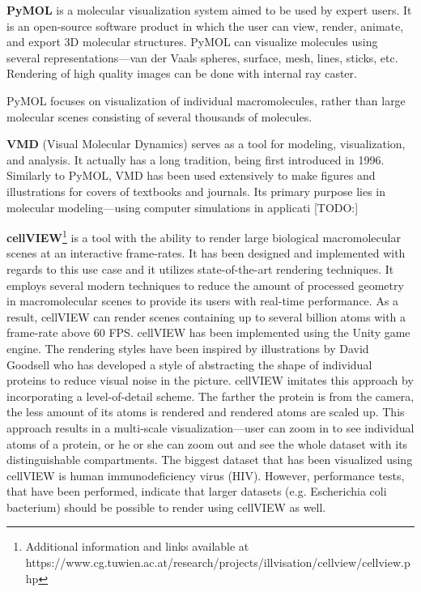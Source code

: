 \documentclass[
  digital, %
  table,   %
  nolof,     %
  nolot,     %
  oneside,
]{fithesis3}
\begin{document}

\textbf{PyMOL} \cite{PyMOL} is a molecular visualization system aimed to be used by expert users. It is an open-source software product in which the user can view, render, animate, and export 3D molecular structures. PyMOL can visualize molecules using several representations—van der Vaals spheres, surface, mesh, lines, sticks, etc. Rendering of high quality images can be done with internal ray caster.

PyMOL focuses on visualization of individual macromolecules, rather than large molecular scenes consisting of several thousands of molecules.

\textbf{VMD} (Visual Molecular Dynamics) \cite{HUMP96} serves as a tool for modeling, visualization, and analysis. It actually has a long tradition, being first introduced in 1996. Similarly to PyMOL, VMD has been used extensively to make figures and illustrations for covers of textbooks and journals. Its primary purpose lies in molecular modeling—using computer simulations in applicati [TODO:]

\textbf{cellVIEW}\footnote{Additional information and links available at https://www.cg.tuwien.ac.at/research/projects/illvisation/cellview/cellview.php} \cite{cellVIEW_2015} is a tool with the ability to render large biological macromolecular scenes at an interactive frame-rates. It has been designed and implemented with regards to this use case and it utilizes state-of-the-art rendering techniques. It employs several modern techniques to reduce the amount of processed geometry in macromolecular scenes to provide its users with real-time performance. As a result, cellVIEW can render scenes containing up to several billion atoms with a frame-rate above 60 FPS. cellVIEW has been implemented using the Unity game engine. The rendering styles have been inspired by illustrations by David Goodsell who has developed a style of abstracting the shape of individual proteins to reduce visual noise in the picture. cellVIEW imitates this approach by incorporating a level-of-detail scheme. The farther the protein is from the camera, the less amount of its atoms is rendered and rendered atoms are scaled up. This approach results in a multi-scale visualization—user can zoom in to see individual atoms of a protein, or he or she can zoom out and see the whole dataset with its distinguishable compartments. The biggest dataset that has been visualized using cellVIEW is human immunodeficiency virus (HIV). However, performance tests, that have been performed, indicate that larger datasets (e.g. Escherichia coli bacterium) should be possible to render using cellVIEW as well.
\end{document}
